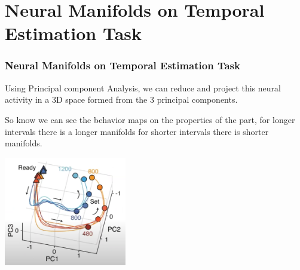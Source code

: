 \documentclass{beamer}
\begin{document}
\section{Neural Manifolds on Temporal Estimation Task}
\begin{frame}
\frametitle{\textbf{Neural Manifolds on Temporal Estimation Task} }


Using Principal component Analysis, we can reduce and project this neural activity in a 3D space formed from the 3 principal components.

So know we can see the behavior maps on the properties of the part, for longer intervals there is a longer manifolds for shorter intervals there is shorter manifolds.

\centering
\begin{minipage}{1\textwidth}
    \centering
    \includegraphics[width=0.4\textwidth]{images/Sohn_et_al-2019_04.PNG} %
\end{minipage}

\end{frame}

\end{document}
